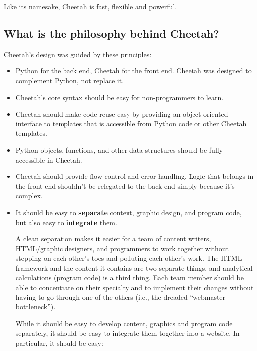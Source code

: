 Like its namesake, Cheetah is fast, flexible and powerful.



\subsection{What is the philosophy behind Cheetah?}
\label{intro.philosophy}

Cheetah's design was guided by these principles:
\begin{itemize}
\item Python for the back end, Cheetah for the front end.  Cheetah was
     designed to complement Python, not replace it.
     
\item Cheetah's core syntax should be easy for non-programmers to learn.
          
\item Cheetah should make code reuse easy by providing an object-oriented
     interface to templates that is accessible from Python code or other
     Cheetah templates.
     
\item Python objects, functions, and other data structures should be fully
     accessible in Cheetah.
       
\item Cheetah should provide flow control and error handling.  Logic
     that belongs in the front end shouldn't be relegated to the 
     back end simply because it's complex.

\item It should be easy to {\bf separate} content, graphic design, and program
     code, but also easy to {\bf integrate} them.

     A clean separation makes it easier for a team of content writers,
     HTML/graphic designers, and programmers to work together without stepping
     on each other's toes and polluting each other's work.  The HTML framework
     and the content it contains are two separate things, and analytical
     calculations (program code) is a third thing.  Each team member should be
     able to concentrate on their specialty and to implement their changes
     without having to go through one of the others (i.e., the dreaded
     ``webmaster bottleneck'').
     
     While it should be easy to develop content, graphics and program
     code separately, it should be easy to integrate them together into a 
     website.  In particular, it should be easy:


\end{itemize}
